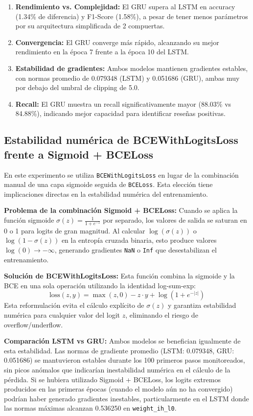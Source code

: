 \begin{enumerate}
    \item \textbf{Rendimiento vs. Complejidad:} El GRU supera al LSTM en accuracy (1.34\% de diferencia) y F1-Score (1.58\%), a pesar de tener menos parámetros por su arquitectura simplificada de 2 compuertas.
    \item \textbf{Convergencia:} El GRU converge más rápido, alcanzando su mejor rendimiento en la época 7 frente a la época 10 del LSTM.
    \item \textbf{Estabilidad de gradientes:} Ambos modelos mantienen gradientes estables, con normas promedio de 0.079348 (LSTM) y 0.051686 (GRU), ambas muy por debajo del umbral de clipping de 5.0.
    \item \textbf{Recall:} El GRU muestra un recall significativamente mayor (88.03\% vs 84.88\%), indicando mejor capacidad para identificar reseñas positivas.
\end{enumerate}

\subsection{Estabilidad numérica de BCEWithLogitsLoss frente a Sigmoid + BCELoss}

En este experimento se utiliza \texttt{BCEWithLogitsLoss} en lugar de la combinación manual de una capa sigmoide seguida de \texttt{BCELoss}. Esta elección tiene implicaciones directas en la estabilidad numérica del entrenamiento.

\textbf{Problema de la combinación Sigmoid + BCELoss:} Cuando se aplica la función sigmoide $\sigma(z) = \frac{1}{1+e^{-z}}$ por separado, los valores de salida se saturan en 0 o 1 para logits de gran magnitud. Al calcular $\log(\sigma(z))$ o $\log(1 - \sigma(z))$ en la entropía cruzada binaria, esto produce valores $\log(0) \to -\infty$, generando gradientes \texttt{NaN} o \texttt{Inf} que desestabilizan el entrenamiento.

\textbf{Solución de BCEWithLogitsLoss:} Esta función combina la sigmoide y la BCE en una sola operación utilizando la identidad log-sum-exp:
\[
\text{loss}(z, y) = \max(z, 0) - z \cdot y + \log(1 + e^{-|z|})
\]
Esta reformulación evita el cálculo explícito de $\sigma(z)$ y garantiza estabilidad numérica para cualquier valor del logit $z$, eliminando el riesgo de overflow/underflow.

\textbf{Comparación LSTM vs GRU:} Ambos modelos se benefician igualmente de esta estabilidad. Las normas de gradiente promedio (LSTM: 0.079348, GRU: 0.051686) se mantuvieron estables durante los 100 primeros pasos monitoreados, sin picos anómalos que indicarían inestabilidad numérica en el cálculo de la pérdida. Si se hubiera utilizado Sigmoid + BCELoss, los logits extremos producidos en las primeras épocas (cuando el modelo aún no ha convergido) podrían haber generado gradientes inestables, particularmente en el LSTM donde las normas máximas alcanzan 0.536250 en \texttt{weight\_ih\_l0}.

